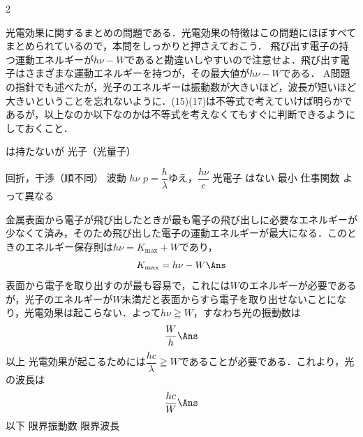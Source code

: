 \begin{multicols}{2}
\par\nopagebreak
\begin{sisin}
光電効果に関するまとめの問題である．光電効果の特徴はこの問題にほぼすべてまとめられているので，本問をしっかりと押さえておこう．
飛び出す電子の持つ運動エネルギーが$h\nu-W$であると勘違いしやすいので注意せよ．飛び出す電子はさまざまな運動エネルギーを持つが，その{\gtfamily 最大値}が$h\nu-W$である．
A問題の指針でも述べたが，光子のエネルギーは振動数が大きいほど，波長が短いほど大きいということを忘れないように．(15)(17)は不等式で考えていけば明らかであるが，以上なのか以下なのかは不等式を考えなくてもすぐに判断できるようにしておくこと．
\end{sisin}
\KaiHead
\begin{komon}
 は持たないが\Ans
{} 光子（光量子）\Ans
\item[{\makebox[1.9zw][r]{(3)(4)}}] 回折，干渉（順不同）\Ans
{} 波動\Ans
{} $h\nu$\Ans
{} $p=\dfrac{h}{\lambda}$ゆえ，$\dfrac{h\nu}{c}$\Ans
{} 光電子\Ans
{} はない\Ans
{} 最小\Ans
{} 仕事関数\Ans
{} よって異なる\Ans\par
 金属表面から電子が飛び出したときが最も電子の飛び出しに必要なエネルギーが少なくて済み，そのため飛び出した電子の運動エネルギーが最大になる．このときのエネルギー保存則は$h\nu=K_{\max}+W$であり，
       \[K_{\max}=h\nu-W\Ans\]
 表面から電子を取り出すのが最も容易で，これには$W$のエネルギーが必要であるが，光子のエネルギーが$W$未満だと表面からすら電子を取り出せないことになり，光電効果は起こらない．よって$h\nu\geqq W$，すなわち光の振動数は
       \[\frac{W}{h}\Ans\]
 以上\Ans
{} 光電効果が起こるためには$\dfrac{hc}{\lambda}\geqq W$であることが必要である．これより，光の波長は
       \[\frac{hc}{W}\Ans\]
 以下\Ans
{} 限界振動数\Ans
{} 限界波長\Ans
\end{komon}


\end{multicols}
